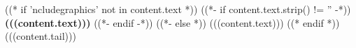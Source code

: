((* if 'ncludegraphics' not in content.text *))
((*- if content.text.strip() != '' -*)) \textbf{(((content.text)))} ((*- endif -*))
((*- else *))
(((content.text)))
((* endif *))
(((content.tail)))
